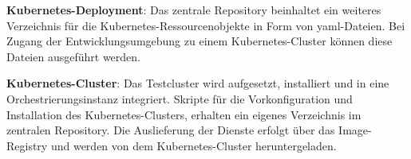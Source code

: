 \textbf{Kubernetes-Deployment}: 
Das zentrale Repository beinhaltet ein weiteres Verzeichnis für die Kubernetes-Ressourcenobjekte in Form von \acs{yaml}-Dateien.
Bei Zugang der Entwicklungsumgebung zu einem Kubernetes-Cluster können diese Dateien ausgeführt werden.

\textbf{Kubernetes-Cluster}: 
Das Testcluster wird aufgesetzt, installiert und in eine Orchestrierungsinstanz integriert.
Skripte für die Vorkonfiguration und Installation des Kubernetes-Clusters, erhalten ein eigenes Verzeichnis im zentralen Repository.
Die Auslieferung der Dienste erfolgt über das Image-Registry und werden von dem Kubernetes-Cluster heruntergeladen.



